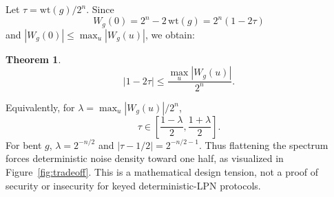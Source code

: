 \documentclass[10pt,twocolumn]{article}
\newtheorem{theorem}{Theorem}
\theoremstyle{definition}
\begin{document}
Let $\tau = \mathrm{wt}(g)/2^n$. Since
\[ W_g(0) = 2^n - 2\,\mathrm{wt}(g) = 2^n(1 - 2\tau) \]
and $|W_g(0)| \leq \max_u |W_g(u)|$, we obtain:

\begin{theorem}\label{thm:tradeoff}
\[ |1 - 2\tau| \leq \frac{\max_u |W_g(u)|}{2^n}. \]
\end{theorem}

Equivalently, for $\lambda = \max_u |W_g(u)|/2^n$,
\[ \tau \in \left[\frac{1-\lambda}{2}, \frac{1+\lambda}{2}\right]. \]
For bent $g$, $\lambda = 2^{-n/2}$ and $|\tau - 1/2| = 2^{-n/2-1}$. Thus flattening the spectrum forces deterministic noise density toward one half, as visualized in Figure~\ref{fig:tradeoff}. This is a mathematical design tension, not a proof of security or insecurity for keyed deterministic-LPN protocols.
\end{document}
